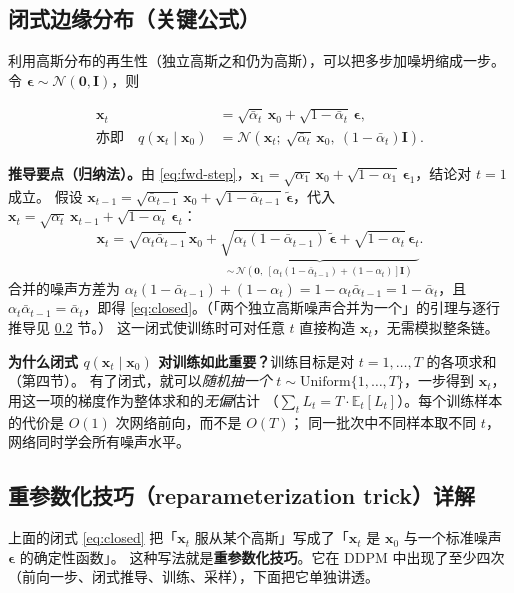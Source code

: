 \documentclass[a4paper,fontset=none,zihao=5]{ctexart}
\numberwithin{equation}{section}
\newcommand{\x}{\mathbf{x}}
\newcommand{\I}{\mathbf{I}}
\newcommand{\N}{\mathcal{N}}
\newcommand{\abar}{\bar{\alpha}}
\newcommand{\eps}{\boldsymbol{\epsilon}}
\newcommand{\E}{\mathbb{E}}
\begin{document}
\subsection{闭式边缘分布（关键公式）}
利用高斯分布的再生性（独立高斯之和仍为高斯），可以把多步加噪坍缩成一步。令 $\eps\sim\N(\mathbf{0},\I)$，则
\begin{keybox}
\begin{align}
  \x_t &= \sqrt{\abar_t}\,\x_0 + \sqrt{1-\abar_t}\,\eps, \label{eq:closed}\\
  \text{亦即}\quad q(\x_t\mid\x_0) &= \N\!\left(\x_t;\ \sqrt{\abar_t}\,\x_0,\ (1-\abar_t)\I\right). \label{eq:closed-dist}
\end{align}
\end{keybox}
\textbf{推导要点（归纳法）。}由 \eqref{eq:fwd-step}，$\x_1=\sqrt{\alpha_1}\,\x_0+\sqrt{1-\alpha_1}\,\eps_1$，结论对 $t=1$ 成立。
假设 $\x_{t-1}=\sqrt{\abar_{t-1}}\,\x_0+\sqrt{1-\abar_{t-1}}\,\tilde{\eps}$，代入 $\x_t=\sqrt{\alpha_t}\,\x_{t-1}+\sqrt{1-\alpha_t}\,\eps_t$：
\begin{equation}
  \x_t = \sqrt{\alpha_t\abar_{t-1}}\,\x_0
        + \underbrace{\sqrt{\alpha_t(1-\abar_{t-1})}\,\tilde{\eps} + \sqrt{1-\alpha_t}\,\eps_t}_{\sim\,\N\left(\mathbf{0},\ [\alpha_t(1-\abar_{t-1}) + (1-\alpha_t)]\I\right)} .
\end{equation}
合并的噪声方差为 $\alpha_t(1-\abar_{t-1})+(1-\alpha_t)=1-\alpha_t\abar_{t-1}=1-\abar_t$，且 $\alpha_t\abar_{t-1}=\abar_t$，即得 \eqref{eq:closed}。（「两个独立高斯噪声合并为一个」的引理与逐行推导见 \ref{sec:reparam} 节。）
这一闭式使训练时可对任意 $t$ 直接构造 $\x_t$，无需模拟整条链。

\begin{whybox}
\textbf{为什么闭式 $q(\x_t\mid\x_0)$ 对训练如此重要？}训练目标是对 $t=1,\dots,T$ 的各项求和（第四节）。
有了闭式，就可以\emph{随机抽一个} $t\sim\mathrm{Uniform}\{1,\dots,T\}$，一步得到 $\x_t$，用这一项的梯度作为整体求和的\emph{无偏}估计
（$\sum_t L_t=T\cdot\E_t[L_t]$）。每个训练样本的代价是 $O(1)$ 次网络前向，而不是 $O(T)$；
同一批次中不同样本取不同 $t$，网络同时学会所有噪声水平。
\end{whybox}

\subsection{重参数化技巧（reparameterization trick）详解}
\label{sec:reparam}
上面的闭式 \eqref{eq:closed} 把「$\x_t$ 服从某个高斯」写成了「$\x_t$ 是 $\x_0$ 与一个标准噪声 $\eps$ 的确定性函数」。
这种写法就是\textbf{重参数化技巧}。它在 DDPM 中出现了至少四次（前向一步、闭式推导、训练、采样），下面把它单独讲透。
\end{document}
